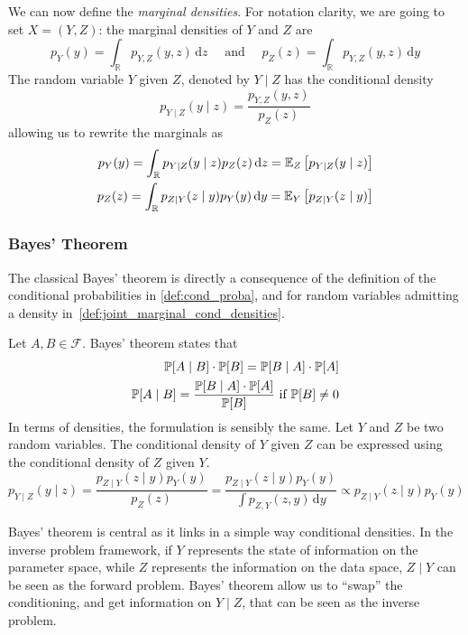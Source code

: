 \documentclass[../../Main_ManuscritThese.tex]{subfiles}
\begin{document}
\begin{definition}
  We can now define the \emph{marginal densities}.  For notation
  clarity, we are going to set $X = (Y,Z)$: the marginal densities of
  $Y$ and $Z$ are
  \begin{equation}
    \label{eq:marginals_def}
    p_{Y}(y) = \int_{\mathbb{R}}p_{Y,Z}(y,z) \,\mathrm{d}z \quad \text{ and } \quad p_{Z}(z) = \int_{\mathbb{R}}p_{Y,Z}(y,z) \,\mathrm{d}y
  \end{equation}
  The random variable $Y$ given $Z$, denoted by $Y \mid Z$ has the conditional density
  \begin{equation}
    p_{Y \mid Z}(y \mid z) = \frac{p_{Y,Z}(y,z)}{p_Z(z)}
  \end{equation}
  allowing us to rewrite the marginals as
  \begin{align}
    \label{eq:marginal_conditioned}
        p_{Y}(y) = \int_{\mathbb{R}}p_{Y\mid Z}(y\mid z)p_Z(z) \,\mathrm{d}z=\mathbb{E}_Z\left[p_{Y\mid Z}(y\mid z)\right] \\ p_{Z}(z) = \int_{\mathbb{R}}p_{Z\mid Y}(z\mid y)p_Y(y) \,\mathrm{d}y = \mathbb{E}_{Y}\left[p_{Z\mid Y}(z\mid y)\right]
  \end{align}

\end{definition}

\subsubsection{Bayes' Theorem}
\label{ssec:bayes_theorem}

The classical Bayes' theorem is directly a consequence of the
definition of the conditional probabilities in \cref{def:cond_proba},
and for random variables admitting a density
in~\cref{def:joint_marginal_cond_densities}.

\begin{theorem}
  Let $A, B\in\mathcal{F}$. Bayes' theorem states that
  \begin{align*}
    \mathbb{P}[A\mid B]\cdot \mathbb{P}[B] = \mathbb{P}[B \mid A]\cdot\mathbb{P}[A] \\
    \mathbb{P}[A \mid B] = \frac{\mathbb{P}[B \mid A]\cdot\mathbb{P}[A]}{\mathbb{P}[B]} \text{ if } \mathbb{P}[B] \neq 0
  \end{align*}
  In terms of densities, the formulation is sensibly the same.  Let
  $Y$ and $Z$ be two random variables. The conditional density of $Y$
  given $Z$ can be expressed using the conditional density of $Z$
  given $Y$.
  \begin{equation}
    p_{Y\mid Z}(y \mid z) = \frac{p_{Z\mid Y}(z\mid y) p_Y(y)}{p_Z(z)} = \frac{p_{Z\mid Y}(z\mid y) p_Y(y)}{\int p_{Z,Y}(z,y) \,\mathrm{d}y}  \propto p_{Z\mid Y}(z\mid y) p_Y(y)
  \end{equation}
\end{theorem}
Bayes' theorem is central as it links in a simple way conditional
densities. In the inverse problem framework, if $Y$ represents the
state of information on the parameter space, while $Z$ represents the
information on the data space, $Z\mid Y$ can be seen as the forward
problem. Bayes' theorem allow us to ``swap'' the conditioning, and get
information on $Y\mid Z$, that can be seen as the inverse problem.
\end{document}
